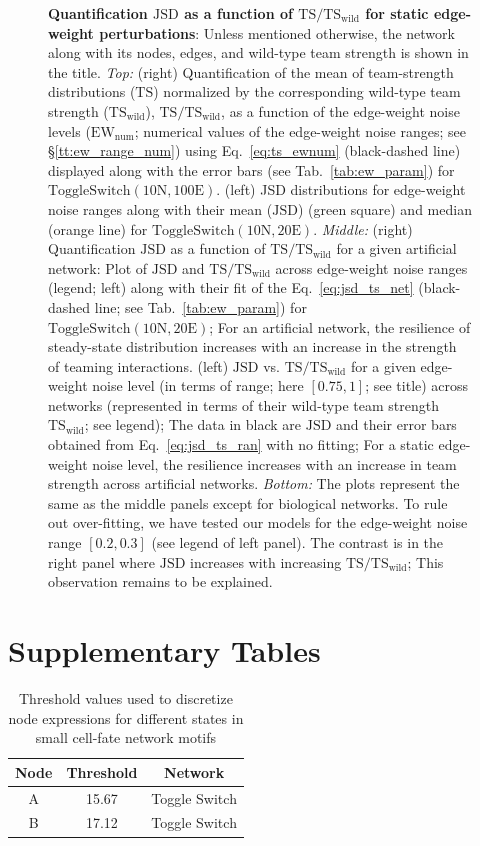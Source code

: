 \documentclass[11pt]{article}
\newcommand{\ts}{\mathrm{TS}}
\newcommand{\jsd}{\mathrm{JSD}}
\newcommand{\tsw}{\mathrm{TS_{wild}}}
\newcommand{\ewnum}{\mathrm{EW_{num}}}
\newcommand{\tsten}{\mathrm{Toggle Switch (10N,100E)}}
\newcommand{\tseight}{\mathrm{Toggle Switch (10N,20E)}}
\begin{document}
\begin{figure}
{\begin{tabular}{c c c c}
\end{tabular}
}
\caption{
\textbf{Quantification $\jsd$ as a function of $\ts/\tsw$ for static edge-weight perturbations}: Unless mentioned otherwise, the network along with its nodes, edges, and wild-type team strength is shown in the title. \textit{Top:} (right) Quantification of the mean of team-strength distributions ($\ts$) normalized by the corresponding wild-type team strength ($\tsw$), $\ts/\tsw$, as a function of the edge-weight noise levels ($\ewnum$; numerical values of the edge-weight noise ranges; see \S\ref{tt:ew_range_num}) using Eq.~\ref{eq:ts_ewnum} (black-dashed line) displayed along with the error bars (see Tab.~\ref{tab:ew_param}) for $\tsten$. (left) JSD distributions for edge-weight noise ranges along with their mean ($\jsd$) (green square) and median (orange line) for $\tseight$. \textit{Middle:} (right) Quantification $\jsd$ as a function of $\ts/\tsw$ for a given artificial network: Plot of $\jsd$ and $\ts/\tsw$ across edge-weight noise ranges (legend; left) along with their fit of the Eq.~\ref{eq:jsd_ts_net} (black-dashed line; see Tab.~\ref{tab:ew_param}) for $\tseight$; For an artificial network, the resilience of steady-state distribution increases with an increase in the strength of teaming interactions. (left) $\jsd$ vs. $\ts/\tsw$ for a given edge-weight noise level (in terms of range; here $[0.75,1]$; see title) across networks (represented in terms of their wild-type team strength $\tsw$; see legend); The data in black are $\jsd$ and their error bars obtained from Eq.~\ref{eq:jsd_ts_ran} with no fitting; For a static edge-weight noise level, the resilience increases with an increase in team strength across artificial networks. \textit{Bottom:} The plots represent the same as the middle panels except for biological networks. To rule out over-fitting, we have tested our models for the edge-weight noise range $[0.2,0.3]$ (see legend of left panel). The contrast is in the right panel where $\jsd$ increases with increasing $\ts/\tsw$; This observation remains to be explained.
}
\label{fig:S2}
\end{figure} 

\newpage
\section{Supplementary Tables}

\begin{table}[h!]
\centering
\caption{\normalsize{Threshold values used to discretize node expressions for different states in small cell-fate network motifs}}
\label{tb:Thresholds}
\begin{tabular}{|c|c|c|}
    \hline
    \textbf{Node} &  \textbf{Threshold} & \textbf{Network}\\
    \hline\hline
    A & 15.67 & Toggle Switch\\
    \hline
    B & 17.12 & Toggle Switch\\
    \hline
    
\end{tabular}


\end{table}
\end{document}
